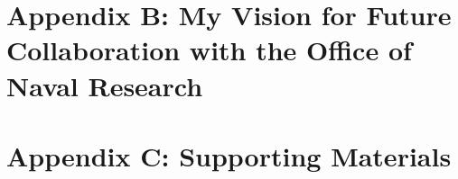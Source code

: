 \documentclass[10pt,oneside]{book}
\begin{document}
\begin{flushleft}

\end{flushleft}

\chapter{Appendix B: My Vision for Future Collaboration with the Office of Naval Research}

\begin{flushleft}

\end{flushleft}

\chapter{Appendix C: Supporting Materials}
\begin{flushleft}

\end{flushleft}



 
\end{document}
